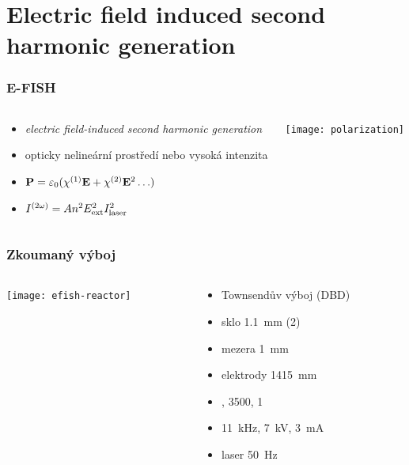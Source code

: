 \documentclass[10pt]{beamer}
\newcommand\epol{P}
\newcommand\esus{\chi}
\newcommand\esusn[1]{\esus^{(#1)}}
\newcommand\eper{\varepsilon}
\newcommand\epervac{\eper_0}
\newcommand\elfieldext{E_\text{ext}}
\newcommand\efishconst{A}
\newcommand\itylaser{I_\text{laser}}
\begin{document}
\section[E-FISH]{Electric field induced second harmonic generation}
\graphicspath{
	{../efish/}
	{img}
}

\begin{frame}
	\frametitle{E-FISH}
	\begin{columns}
	\begin{column}{0.5\textwidth}
		\begin{itemize}
			\item \emph{electric field-induced second harmonic generation}
			\item opticky nelineární prostředí nebo vysoká intenzita
			\item $\vec\epol = \epervac (\esusn1\vec\elfield + \esusn2\vec\elfield^2
				\ldots)$
			\item $\efish = \efishconst \ndens^2 \elfieldext^2 \itylaser^2$
		\end{itemize}
	\end{column}
	\begin{column}{0.5\textwidth}
		\texttt{[image: polarization]}
	\end{column}
	\end{columns}
\end{frame}

\begin{frame}
	\frametitle{Zkoumaný výboj}
	\begin{columns}
	\begin{column}{0.6\textwidth}
		\texttt{[image: efish-reactor]}
		
	\end{column}
	\begin{column}{0.4\textwidth}
		\begin{itemize}
			\item Townsendův výboj (DBD)
			\item sklo \SI{1.1}{\milli\metre} (2\times)
			\item mezera \SI{1}{\milli\metre}
			\item elektrody \num{14}\times\SI{15}{\milli\metre}
			\item {}, \SI{3500}{\sccm}, \SI{1}{\atmosphere}
			\item \SI{11}{\kilo\hertz}, \SI{7}{\kilo\volt},
				\SI{3}{\milli\ampere}
			\item laser \SI{50}{\hertz}
		\end{itemize}
	\end{column}
	\end{columns}
\end{frame}
\end{document}
